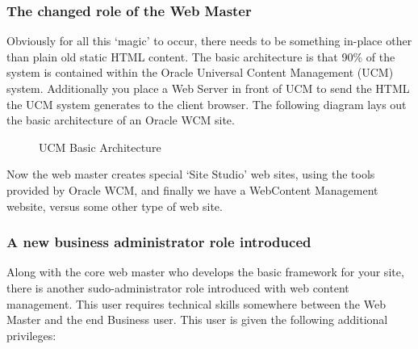 \subsubsection{The changed role of the Web Master}
Obviously for all this `magic' to occur, there needs to be something
in-place other than plain old static HTML content. The basic
architecture is that 90\% of the system is contained within the Oracle
Universal Content Management (UCM) system.  Additionally you place a
Web Server in front of UCM to send the HTML the UCM system generates
to the client browser.  The following diagram lays out the basic
architecture of an Oracle WCM site.
	
\begin{figure}[h!]
  \centering
  \caption{UCM Basic Architecture}
\end{figure}

\clearpage

Now the web master creates special `Site Studio' web sites, using the
tools provided by Oracle WCM, and finally we have a WebContent
Management website, versus some other type of web site.

\subsubsection{A new business administrator role introduced}
Along with the core web master who develops the basic framework for
your site, there is another sudo-administrator role introduced with
web content management.  This user requires technical skills somewhere
between the Web Master and the end Business user.  This user is given
the following additional privileges:

